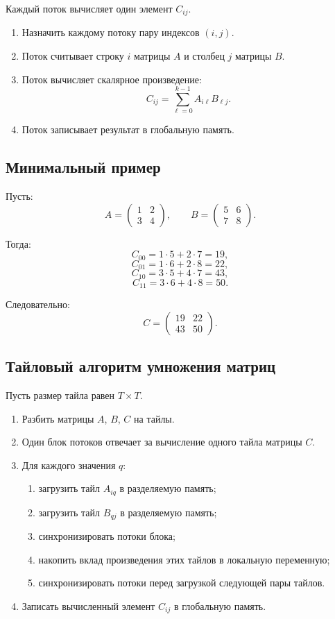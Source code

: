 \documentclass[12pt,a4paper]{article}
\begin{document}
Каждый поток вычисляет один элемент $C_{ij}$.

\begin{enumerate}
    \item Назначить каждому потоку пару индексов $(i,j)$.
    \item Поток считывает строку $i$ матрицы $A$ и столбец $j$ матрицы $B$.
    \item Поток вычисляет скалярное произведение:
    \[
        C_{ij} = \sum_{\ell=0}^{k-1} A_{i\ell}B_{\ell j}.
    \]
    \item Поток записывает результат в глобальную память.
\end{enumerate}

\subsection{Минимальный пример}

Пусть:
\[
A =
\begin{pmatrix}
1 & 2 \\
3 & 4
\end{pmatrix},
\qquad
B =
\begin{pmatrix}
5 & 6 \\
7 & 8
\end{pmatrix}.
\]

Тогда:
\[
C_{00} = 1\cdot 5 + 2\cdot 7 = 19,
\]
\[
C_{01} = 1\cdot 6 + 2\cdot 8 = 22,
\]
\[
C_{10} = 3\cdot 5 + 4\cdot 7 = 43,
\]
\[
C_{11} = 3\cdot 6 + 4\cdot 8 = 50.
\]

Следовательно:
\[
C =
\begin{pmatrix}
19 & 22 \\
43 & 50
\end{pmatrix}.
\]

\subsection{Тайловый алгоритм умножения матриц}

Пусть размер тайла равен $T \times T$.

\begin{enumerate}
    \item Разбить матрицы $A$, $B$, $C$ на тайлы.
    \item Один блок потоков отвечает за вычисление одного тайла матрицы $C$.
    \item Для каждого значения $q$:
    \begin{enumerate}
        \item загрузить тайл $A_{iq}$ в разделяемую память;
        \item загрузить тайл $B_{qj}$ в разделяемую память;
        \item синхронизировать потоки блока;
        \item накопить вклад произведения этих тайлов в локальную переменную;
        \item синхронизировать потоки перед загрузкой следующей пары тайлов.
    \end{enumerate}
    \item Записать вычисленный элемент $C_{ij}$ в глобальную память.
\end{enumerate}
\end{document}
